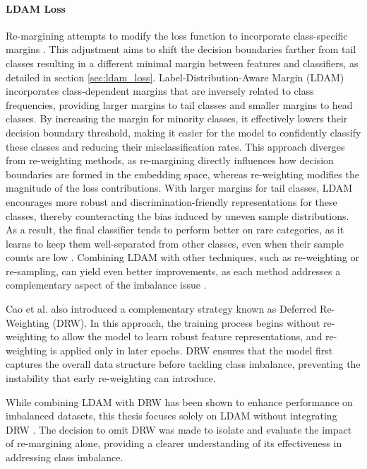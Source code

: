 \paragraph{LDAM Loss}
Re-margining attempts to modify the loss function to incorporate class-specific margins \cite{zhang2023deep}. This adjustment aims to shift the decision boundaries farther from tail classes resulting in a different minimal margin between features and classifiers, as detailed in section \ref{sec:ldam_loss}. Label-Distribution-Aware Margin (LDAM) \cite{cao2019learningimbalanceddatasetslabeldistributionaware} incorporates class-dependent margins that are inversely related to class frequencies, providing larger margins to tail classes and smaller margins to head classes. By increasing the margin for minority classes, it effectively lowers their decision boundary threshold, making it easier for the model to confidently classify these classes and reducing their misclassification rates. This approach diverges from re-weighting methods, as re-margining directly influences how decision boundaries are formed in the embedding space, whereas re-weighting modifies the magnitude of the loss contributions. With larger margins for tail classes, LDAM encourages more robust and discrimination-friendly representations for these classes, thereby counteracting the bias induced by uneven sample distributions. As a result, the final classifier tends to perform better on rare categories, as it learns to keep them well-separated from other classes, even when their sample counts are low \cite{cao2019learningimbalanceddatasetslabeldistributionaware}. Combining LDAM with other techniques, such as re-weighting or re-sampling, can yield even better improvements, as each method addresses a complementary aspect of the imbalance issue \cite{cao2019learningimbalanceddatasetslabeldistributionaware}. 

Cao et al. \cite{cao2019learningimbalanceddatasetslabeldistributionaware} also introduced a complementary strategy known as Deferred Re-Weighting (DRW). In this approach, the training process begins without re-weighting to allow the model to learn robust feature representations, and re-weighting is applied only in later epochs. DRW ensures that the model first captures the overall data structure before tackling class imbalance, preventing the instability that early re-weighting can introduce.

While combining LDAM with DRW has been shown to enhance performance on imbalanced datasets, this thesis focuses solely on LDAM without integrating DRW \cite{cao2019learningimbalanceddatasetslabeldistributionaware}. The decision to omit DRW was made to isolate and evaluate the impact of re-margining alone, providing a clearer understanding of its effectiveness in addressing class imbalance.

